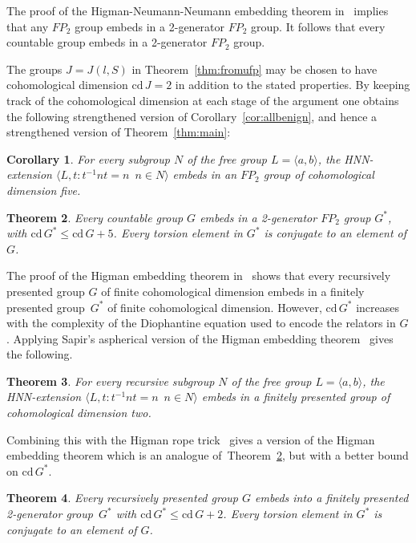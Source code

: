 \documentclass[12pt,a4paper]{article}
\newtheorem{theorem}{Theorem}[section]
\newtheorem{corollary}[theorem]{Corollary}
\newcommand{\cd}{{\mathrm{cd}\,}}
\begin{document}
The proof of the Higman-Neumann-Neumann embedding theorem 
in~\cite[IV.3]{lynsch} implies that any $FP_2$ group embeds 
in a 2-generator $FP_2$ group.  It follows that 
every countable group embeds in a 2-generator $FP_2$ group.  

The groups $J=J(l,S)$ in Theorem~\ref{thm:fromufp} may be chosen to have
cohomological dimension $\cd J=2$ in addition to the stated
properties.  By keeping track of the cohomological dimension at each
stage of the argument one obtains the following strengthened version of 
Corollary~\ref{cor:allbenign}, and hence a strengthened version of
Theorem~\ref{thm:main}: 

\begin{corollary}
For every subgroup $N$ of the free group $L=\langle a,b\rangle$, the 
HNN-extension $\langle L, t\colon t^{-1}nt= n \,\,\,n\in N\rangle$ 
embeds in an $FP_2$ group of cohomological dimension five.  
\end{corollary} 

\begin{theorem} \label{thm:maincd}
Every countable group $G$ embeds in a 2-generator $FP_2$ group $G^*$, with 
$\cd G^*\leq \cd G+5$.  Every torsion element in $G^*$ is conjugate to
an element of $G$.  
\end{theorem}  

The proof of the Higman embedding theorem in~\cite[IV.7]{lynsch} shows 
that every recursively presented group $G$ of finite cohomological
dimension embeds in a finitely presented group~$G^*$ of finite 
cohomological dimension.  However, $\cd G^*$ increases with the complexity 
of the Diophantine equation used to encode the relators in $G$.  Applying
Sapir's aspherical version of the Higman embedding theorem~\cite{sapir} 
gives the following.  
\begin{theorem}
For every recursive subgroup $N$ of the free group 
$L=\langle a,b\rangle$, the HNN-extension 
$\langle L, t\colon t^{-1}nt= n \,\,\,n\in N\rangle$ embeds in 
a finitely presented group of cohomological dimension two.  
\end{theorem} 
Combining this with the Higman rope trick~\cite[IV.7.6]{lynsch} 
gives a version of the Higman embedding theorem which 
is an analogue of~Theorem~\ref{thm:maincd}, but with a better bound on
$\cd G^*$.   

\begin{theorem} 
Every recursively presented group $G$ embeds into a finitely presented
2-generator group~$G^*$ with $\cd G^*\leq \cd G+2$.  Every torsion element in 
$G^*$ is conjugate to an element of $G$.  
\end{theorem} 
\end{document}
